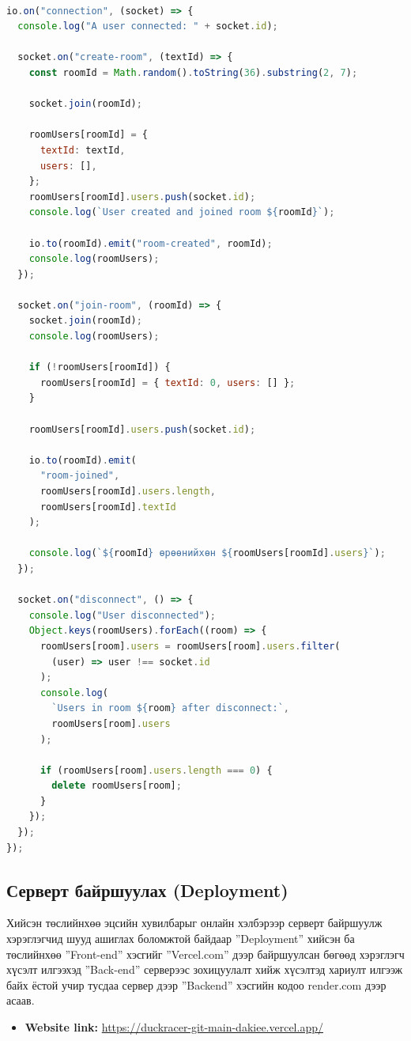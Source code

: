 \begin{lstlisting}[language=Javascript, caption=Socket ашиглан хэрэглэгчдийг зохицуулах, frame=single]
	
io.on("connection", (socket) => {
  console.log("A user connected: " + socket.id);

  socket.on("create-room", (textId) => {
    const roomId = Math.random().toString(36).substring(2, 7);

    socket.join(roomId);

    roomUsers[roomId] = {
      textId: textId,
      users: [],
    };
    roomUsers[roomId].users.push(socket.id);
    console.log(`User created and joined room ${roomId}`);

    io.to(roomId).emit("room-created", roomId);
    console.log(roomUsers);
  });

  socket.on("join-room", (roomId) => {
    socket.join(roomId);
    console.log(roomUsers);

    if (!roomUsers[roomId]) {
      roomUsers[roomId] = { textId: 0, users: [] };
    }

    roomUsers[roomId].users.push(socket.id);

    io.to(roomId).emit(
      "room-joined",
      roomUsers[roomId].users.length,
      roomUsers[roomId].textId
    );

    console.log(`${roomId} өрөөнийхөн ${roomUsers[roomId].users}`);
  });

  socket.on("disconnect", () => {
    console.log("User disconnected");
    Object.keys(roomUsers).forEach((room) => {
      roomUsers[room].users = roomUsers[room].users.filter(
        (user) => user !== socket.id
      );
      console.log(
        `Users in room ${room} after disconnect:`,
        roomUsers[room].users
      );

      if (roomUsers[room].users.length === 0) {
        delete roomUsers[room];
      }
    });
  });
});

\end{lstlisting}


\subsection{Серверт байршуулах (Deployment)}

Хийсэн төслийнхөө эцсийн хувилбарыг онлайн хэлбэрээр серверт байршуулж хэрэглэгчид шууд ашиглах боломжтой байдаар ”Deployment” хийсэн ба төслийнхөө ”Front-end” хэсгийг ”Vercel.com” дээр байршуулсан бөгөөд хэрэглэгч хүсэлт илгээхэд ”Back-end” серверээс зохицуулалт хийж хүсэлтэд хариулт илгээж байх ёстой учир тусдаа сервер дээр ”Backend” хэсгийн кодоо render.com дээр асаав.


\begin{itemize}
	\item \textbf{Website link:} \url{https://duckracer-git-main-dakiee.vercel.app/}
\end{itemize}